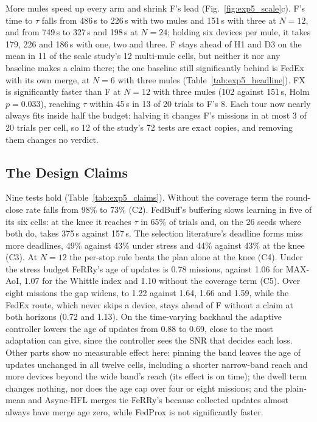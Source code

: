 More mules speed up every arm and shrink F's lead (Fig.~\ref{fig:exp5_scale}c). F's
time to $\tau$ falls from 486\,s to 226\,s with two mules and 151\,s with three at
$N=12$, and from 749\,s to 327\,s and 198\,s at $N=24$; holding six devices per mule,
it takes 179, 226 and 186\,s with one, two and three. F stays ahead of H1 and D3
on the mean in 11 of the scale study's 12 multi-mule cells, but neither it nor any
baseline makes a claim there; the one baseline still significantly behind is FedEx
with its own merge, at $N=6$ with three mules (Table~\ref{tab:exp5_headline}). FX
is significantly faster than F at $N=12$ with three mules (102 against 151\,s, Holm
$p=0.033$), reaching $\tau$ within 45\,s in 13 of 20 trials to F's 8. Each tour now
nearly always fits inside half the budget: halving it changes F's missions in at
most 3 of 20 trials per cell, so 12 of the study's 72 tests are exact copies, and
removing them changes no verdict.


\subsection{The Design Claims}
\label{sec:res:claims}

Nine tests hold (Table~\ref{tab:exp5_claims}). Without the coverage term the
round-close rate falls from 98\% to 73\% (C2). FedBuff's buffering slows learning
in five of its six cells: at the knee it reaches $\tau$ in 65\% of trials and, on
the 26 seeds where both do, takes 375\,s against 157\,s. The selection
literature's deadline forms miss more deadlines, 49\% against 43\% under stress
and 44\% against 43\% at the knee (C3). At $N=12$ the per-stop rule beats the plan
alone at the knee (C4). Under the stress budget FeRRy's age of updates is 0.78
missions, against 1.06 for MAX-AoI, 1.07 for the Whittle index and 1.10 without
the coverage term (C5). Over eight missions the gap widens, to 1.22 against 1.64,
1.66 and 1.59, while the FedEx route, which never skips a device, stays ahead of
F without a claim at both horizons (0.72 and 1.13). On the time-varying backhaul the
adaptive controller lowers the age of updates from 0.88 to 0.69, close to the most adaptation
can give, since the controller sees the SNR that decides each loss. Other parts
show no measurable effect here: pinning the band leaves the age of updates
unchanged in all twelve cells, including a shorter narrow-band reach and more
devices beyond the wide band's reach (its effect is on time); the dwell term
changes nothing, nor does the age cap over four or eight missions; and the
plain-mean and Async-HFL merges tie FeRRy's because collected updates almost
always have merge age zero, while FedProx is not significantly faster.

